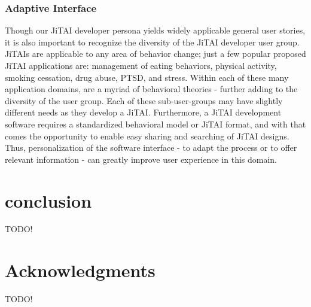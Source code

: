 \documentclass{sigchi}
\begin{document}
\subsubsection{Adaptive Interface}
Though our JiTAI developer persona yields widely applicable general user stories, it is also important to recognize the diversity of the JiTAI developer user group.
JiTAIs are applicable to any area of behavior change; just a few popular proposed JiTAI applications are: management of eating behaviors, physical activity, smoking cessation, drug abuse, PTSD, and stress.
Within each of these many application domains, are a myriad of behavioral theories - further adding to the diversity of the user group.
Each of these sub-user-groups may have slightly different needs as they develop a JiTAI.
Furthermore, a JiTAI development software requires a standardized behavioral model or JiTAI format, and with that comes the opportunity to enable easy sharing and searching of JiTAI designs.
Thus, personalization of the software interface - to adapt the process or to offer relevant information\cite{kay2012creating} - can greatly improve user experience in this domain.

\section{conclusion}
TODO!

\section{Acknowledgments}

TODO!

%
%
%
%
%
\balance{}



\end{document}
